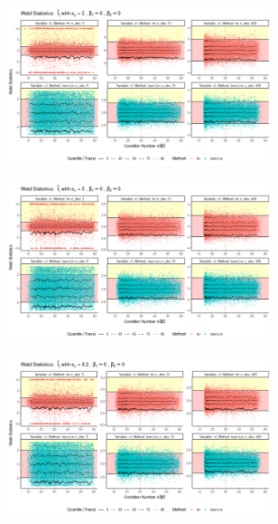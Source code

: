 \documentclass[11pt,a4paper,twoside]{book}\usepackage[]{graphicx}\usepackage[]{xcolor}
\begin{document}
\begin{figure}[H]
\centering
\begin{subfigure}[b]{1\textwidth}
\vspace*{-0.5cm}
\centering
\includegraphics[width=0.85\textwidth]{../fromsim/simres_wald101-1.png}
\end{subfigure}
\begin{subfigure}[b]{1\textwidth}
\vspace*{-0.9cm}
\centering
\includegraphics[width=0.85\textwidth]{../fromsim/simres_wald111-1.png}
\end{subfigure}
\begin{subfigure}[b]{1\textwidth}
\vspace*{-0.9cm}
\centering
\includegraphics[width=0.85\textwidth]{../fromsim/simres_wald121-1.png}

\end{subfigure}
\end{figure}
\end{document}
